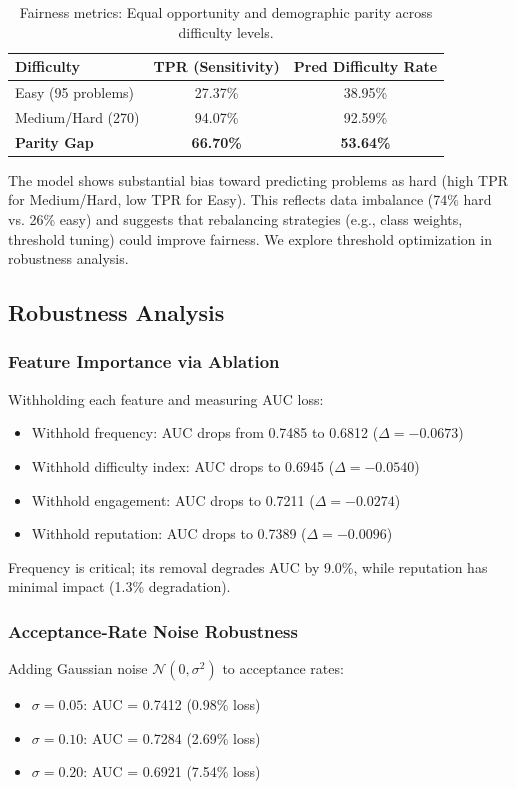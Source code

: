 \documentclass[conference]{IEEEtran}
\begin{document}
\begin{table}[t]
\caption{Fairness metrics: Equal opportunity and demographic parity across difficulty levels.}
\label{tab:fairness_parity}
\centering
\begin{tabular}{lcc}
\toprule
\textbf{Difficulty} & \textbf{TPR (Sensitivity)} & \textbf{Pred Difficulty Rate} \\
\midrule
Easy (95 problems) & 27.37\% & 38.95\% \\
Medium/Hard (270) & 94.07\% & 92.59\% \\
\textbf{Parity Gap} & \textbf{66.70\%} & \textbf{53.64\%} \\
\bottomrule
\end{tabular}
\end{table}

The model shows substantial bias toward predicting problems as hard (high TPR for Medium/Hard, low TPR for Easy). This reflects data imbalance (74\% hard vs. 26\% easy) and suggests that rebalancing strategies (e.g., class weights, threshold tuning) could improve fairness. We explore threshold optimization in robustness analysis.

\subsection{Robustness Analysis}

\subsubsection{Feature Importance via Ablation}
Withholding each feature and measuring AUC loss:
\begin{itemize}
    \item Withhold frequency: AUC drops from 0.7485 to 0.6812 ($\Delta = -0.0673$)
    \item Withhold difficulty index: AUC drops to 0.6945 ($\Delta = -0.0540$)
    \item Withhold engagement: AUC drops to 0.7211 ($\Delta = -0.0274$)
    \item Withhold reputation: AUC drops to 0.7389 ($\Delta = -0.0096$)
\end{itemize}

Frequency is critical; its removal degrades AUC by 9.0\%, while reputation has minimal impact (1.3\% degradation).

\subsubsection{Acceptance-Rate Noise Robustness}
Adding Gaussian noise $\mathcal{N}(0, \sigma^2)$ to acceptance rates:
\begin{itemize}
    \item $\sigma = 0.05$: AUC = 0.7412 (0.98\% loss)
    \item $\sigma = 0.10$: AUC = 0.7284 (2.69\% loss)
    \item $\sigma = 0.20$: AUC = 0.6921 (7.54\% loss)
\end{itemize}
\end{document}
